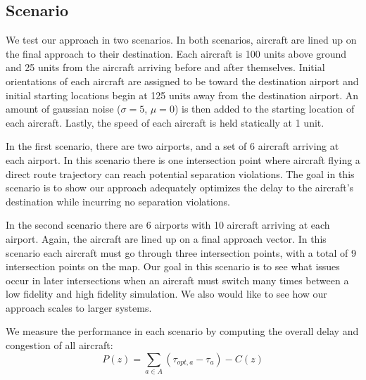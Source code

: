 \documentclass{aamas2014}
\begin{document}
\subsection{Scenario}

We test our approach in two scenarios. In both scenarios, aircraft are lined up on the final approach to their destination. Each aircraft is 100 units above ground and 25 units from the aircraft arriving before and after themselves. Initial orientations of each aircraft are assigned to be toward the destination airport and initial starting locations begin at 125 units away from the destination airport. An amount of gaussian noise ($\sigma = 5$, $\mu = 0$) is then added to the starting location of each aircraft. Lastly, the speed of each aircraft is held statically at 1 unit.

In the first scenario, there are two airports, and a set of 6 aircraft arriving at each airport. In this scenario there is one intersection point where aircraft flying a direct route trajectory can reach potential separation violations. The goal in this scenario is to show our approach adequately optimizes the delay to the aircraft's destination while incurring no separation violations.

In the second scenario there are 6 airports with 10 aircraft arriving at each airport. Again, the aircraft are lined up on a final approach vector. In this scenario each aircraft must go through three intersection points, with a total of 9 intersection points on the map. Our goal in this scenario is to see what issues occur in later intersections when an aircraft must switch many times between a low fidelity and high fidelity simulation. We also would like to see how our approach scales to larger systems.

We measure the performance in each scenario by computing the overall delay and congestion of all aircraft:
%
\begin{equation}
P(z) = \sum_{a \in A}{(\tau_{opt, a} - \tau_a) - C(z)}
\end{equation}
\end{document}
